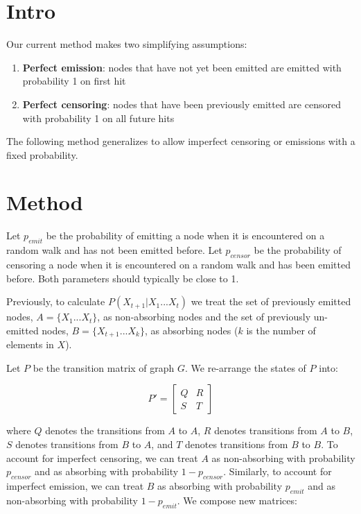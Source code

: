 \documentclass{article}
\begin{document}
\section{Intro}

Our current method makes two simplifying assumptions:

\begin{enumerate}
    \item \textbf{Perfect emission}: nodes that have not yet been emitted are
        emitted with probability 1 on first hit

    \item \textbf{Perfect censoring}: nodes that have been previously emitted
        are censored with probability 1 on all future hits
\end{enumerate}

The following method generalizes to allow imperfect censoring or emissions with
a fixed probability.

\section{Method}

Let $p_{emit}$ be the probability of emitting a node when it is encountered on a
random walk and has not been emitted before. Let $p_{censor}$ be the probability
of censoring a node when it is encountered on a random walk and has been
emitted before. Both parameters should typically be close to 1.

\vspace{5mm}

Previously, to calculate $P(X_{t+1}|X_1...X_t)$ we treat the set of previously
emitted nodes, $A=\{X_1...X_t\}$, as non-absorbing nodes and the set of
previously un-emitted nodes, $B=\{X_{t+1}...X_k\}$, as absorbing nodes ($k$ is
the number of elements in $X$).

\vspace{5mm}

Let $P$ be the transition matrix of graph $G$. We re-arrange the states of $P$ into:

\[
    P'=
    \begin{bmatrix}
        Q & R \\
        S & T
    \end{bmatrix}
\]

where $Q$ denotes the transitions from $A$ to $A$, $R$ denotes transitions from
$A$ to $B$, $S$ denotes transitions from $B$ to $A$, and $T$ denotes
transitions from $B$ to $B$. To account for imperfect censoring, we can treat
$A$ as non-absorbing with probability $p_{censor}$ and as absorbing with
probability $1-p_{censor}$. Similarly, to account for imperfect emission, we can
treat $B$ as absorbing with probability $p_{emit}$ and as non-absorbing with
probability $1-p_{emit}$. We compose new matrices:
\end{document}
